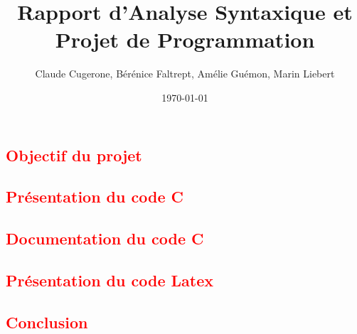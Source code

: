 \documentclass[10pt,a4paper]{report}
\begin{document}
\title{Rapport d'Analyse Syntaxique et Projet de Programmation}

\date{\today}

\author{Claude Cugerone, Bérénice Faltrept, Amélie Guémon, Marin Liebert}

\textcolor{red}{\section{Objectif du projet}}

\textcolor{red}{\section{Présentation du code C}}

\textcolor{red}{\section{Documentation du code C}}

\textcolor{red}{\section{Présentation du code Latex}}

\textcolor{red}{\section{Conclusion}}
\end{document}
